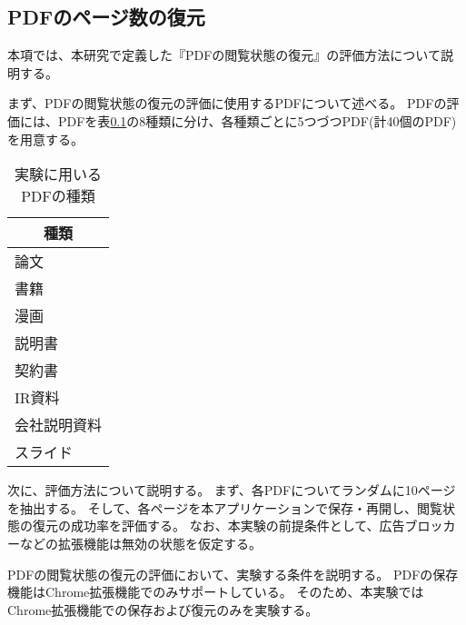 \subsection{PDFのページ数の復元}
本項では、本研究で定義した『PDFの閲覧状態の復元』の評価方法について説明する。

まず、PDFの閲覧状態の復元の評価に使用するPDFについて述べる。
PDFの評価には、PDFを表\ref{}の8種類に分け、各種類ごとに5つづつPDF(計40個のPDF)を用意する。

\begin{table}[htbp]
  \label{tb:evl-pdf-list}
  \caption{実験に用いるPDFの種類}
  \begin{center}
    \begin{tabular}{|l|}
    \hline
    \multicolumn{1}{|c|}{\textbf{種類}} \\\hline
    論文 \\ \hline
    書籍 \\ \hline
    漫画 \\ \hline
    説明書 \\ \hline
    契約書 \\ \hline
    IR資料 \\ \hline
    会社説明資料 \\ \hline
    スライド \\ \hline
    \end{tabular}
  \end{center}
\end{table}

次に、評価方法について説明する。
まず、各PDFについてランダムに10ページを抽出する。
そして、各ページを本アプリケーションで保存・再開し、閲覧状態の復元の成功率を評価する。
なお、本実験の前提条件として、広告ブロッカーなどの拡張機能は無効の状態を仮定する。

PDFの閲覧状態の復元の評価において、実験する条件を説明する。
PDFの保存機能はChrome拡張機能でのみサポートしている。
そのため、本実験ではChrome拡張機能での保存および復元のみを実験する。
